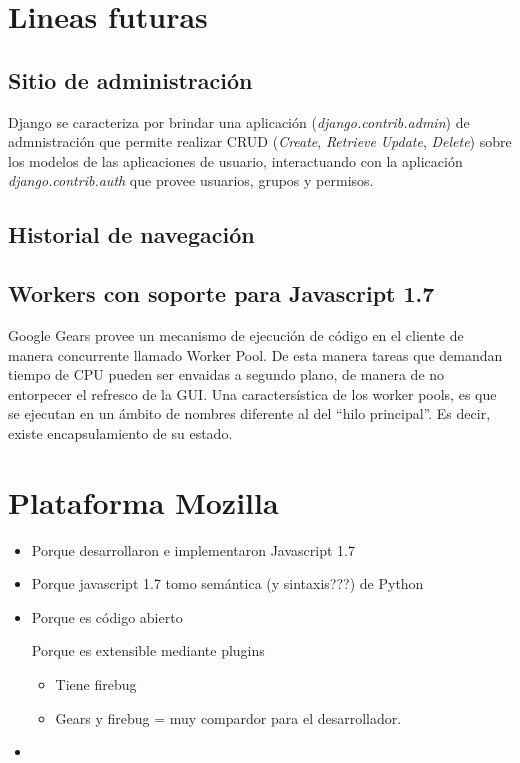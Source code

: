 \documentclass[a4paper]{report}
\begin{document}
\chapter{Lineas futuras}
\section{Sitio de administración}
Django se caracteriza por brindar una aplicación (\textit{django.contrib.admin})
de admnistración que permite realizar CRUD (\textit{Create}, \textit{Retrieve}
\textit{Update}, \textit{Delete}) sobre los modelos de las aplicaciones de
usuario, interactuando con la aplicación \textit{django.contrib.auth} que provee
usuarios, grupos y permisos.
 
\section{Historial de navegación}

\section{Workers con soporte para Javascript 1.7}
Google Gears provee un mecanismo de ejecución de código en el cliente de manera
concurrente llamado Worker Pool. De esta manera tareas que demandan tiempo de
CPU pueden ser envaidas a segundo plano, de manera de no entorpecer el refresco 
de la GUI.
Una caractersística de los worker pools, es que se ejecutan en un ámbito de 
nombres diferente al del ``hilo principal''. Es decir, existe encapsulamiento
de su estado.
 
\appendix




\chapter{Plataforma Mozilla}
\begin{itemize}
  \item Porque desarrollaron e implementaron Javascript 1.7
  \item Porque javascript 1.7 tomo semántica (y sintaxis???) de Python
  \item Porque es código abierto
  \begin{item}
  	Porque es extensible mediante plugins
  	\begin{itemize}
        \item Tiene firebug
        \item Gears y firebug = muy compardor para el desarrollador.
     \end{itemize}
      
  \end{item}
  \item 
\end{itemize}
\end{document}
